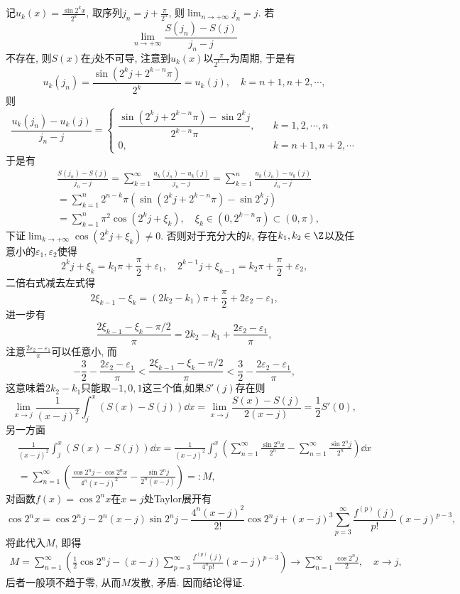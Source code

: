 \begin{quiza}
\begin{enumerate}
\begin{proofc}[好像是错误的解答]
记\(u_k(x)=\frac{\sin 2^kx}{2^k}\), 取序列\(j_n=j+\frac{\pi}{2^n}\), 
则\(\lim_{n\rightarrow+\infty}j_n=j\).  若
\[\lim_{n\rightarrow+\infty}\frac{S(j_n)-S(j)}{j_n-j}\]
不存在, 则\(S(x)\)在\(j\)处不可导, 注意到\(u_k(x)\)以\(\frac{\pi}{2^{k-1}}\)为周期, 
于是有\[u_k(j_n)=\frac{\sin\left(2^kj+2^{k-n}\pi\right)}{2^k}=u_k(j),\quad k=n+1,n+2,\cdots,\]
则\[\frac{u_k(j_n)-u_k(j)}{j_n-j}=\begin{cases}
\dfrac{\sin(2^kj+2^{k-n}\pi)-\sin 2^kj}{2^{k-n}\pi},\quad &k=1,2,\cdots,n\\
0,&k=n+1,n+2,\cdots
\end{cases}\]于是有\[\begin{split}
&\frac{S(j_n)-S(j)}{j_n-j}=\sum_{k=1}^{\infty}\frac{u_k(j_n)-u_k(j)}{j_n-j}
=\sum_{k=1}^{n}\frac{u_k(j_n)-u_k(j)}{j_n-j}\\
&=\sum_{k=1}^{n}2^{n-k}\pi\left(\sin\left(2^kj+2^{k-n}\pi\right)-\sin 2^kj\right)\\
&=\sum_{k=1}^{n}\pi^2\cos\left(2^kj+\xi_k\right),\quad \xi_k\in(0,2^{k-n}\pi)\subset(0,\pi),
\end{split}\]
下证\(\lim_{k\rightarrow+\infty}\cos\left(2^kj+\xi_k\right)\ne 0\). 
否则对于充分大的\(k\), 存在\(k_1,k_2\in\Z\)以及任意小的\(\varepsilon_1,\varepsilon_2\)使得
\[2^kj+\xi_k=k_1\pi+\frac{\pi}{2}+\varepsilon_1,\quad 2^{k-1}j+\xi_{k-1}=k_2\pi+\frac{\pi}{2}+\varepsilon_2,\]
二倍右式减去左式得\[2\xi_{k-1}-\xi_k=(2k_2-k_1)\pi+\frac{\pi}{2}+2\varepsilon_2-\varepsilon_1,\]
进一步有\[\frac{2\xi_{k-1}-\xi_k-\pi/2}{\pi}=2k_2-k_1+\frac{2\varepsilon_2-\varepsilon_1}{\pi},\]
注意\(\frac{2\varepsilon_2-\varepsilon_1}{\pi}\)可以任意小, 而
\[-\frac{3}{2}-\frac{2\varepsilon_2-\varepsilon_1}{\pi}
<\frac{2\xi_{k-1}-\xi_k-\pi/2}{\pi}
<\frac{3}{2}-\frac{2\varepsilon_2-\varepsilon_1}{\pi},\]
这意味着\(2k_2-k_1\)只能取\(-1,0,1\)这三个值,如果\(S'(j)\)存在则
\[\lim_{x\rightarrow j}\frac{1}{(x-j)^2}\int_{j}^{x}\left(S(x)-S(j)\right)\dd x
=\lim_{x\rightarrow j}\frac{S(x)-S(j)}{2(x-j)}=\frac{1}{2}S'(0),\]
另一方面\[\begin{split}
&\frac{1}{(x-j)^2}\int_{j}^{x}\left(S(x)-S(j)\right)\dd x
=\frac{1}{(x-j)^2}\int_{j}^{x}\left(\sum_{n=1}^{\infty}\frac{\sin 2^nx}{2^n}-\sum_{n=1}^{\infty}\frac{\sin 2^nj}{2^n}\right)\dd x\\
&=\sum_{n=1}^{\infty}\left(\frac{\cos 2^n j-\cos 2^n x}{4^n(x-j)^2}-\frac{\sin 2^nj}{2^n\left(x-j\right)}\right)=:M,
\end{split}\]对函数\(f(x)=\cos 2^nx\)在\(x=j\)处Taylor展开有
\[\cos 2^n x=\cos 2^nj-2^n(x-j)\sin 2^nj-\frac{4^n(x-j)^2}{2!}\cos 2^nj+(x-j)^3\sum_{p=3}^{\infty}\frac{f^{(p)}(j)}{p!}(x-j)^{p-3},\]
将此代入\(M\), 即得\[\begin{split}
M=\sum_{n=1}^{\infty}\left(\frac{1}{2}\cos 2^nj-(x-j)\sum_{p=3}^{\infty}\frac{f^{(p)}(j)}{4^np!}(x-j)^{p-3}\right)
\rightarrow\sum_{n=1}^{\infty}\frac{\cos 2^nj}{2},\quad x\rightarrow j,
\end{split}\]后者一般项不趋于零, 从而\(M\)发散, 矛盾. 因而结论得证.
\end{proofc}
\end{enumerate}
\end{quiza}

